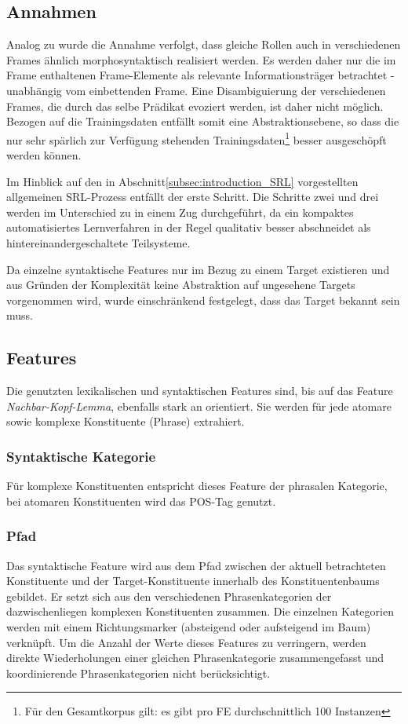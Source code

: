 \documentclass[12pt]{article}
\begin{document}
\subsection{Annahmen}

Analog zu \cite{gildea} wurde die Annahme verfolgt, dass gleiche Rollen auch in verschiedenen Frames ähnlich morphosyntaktisch realisiert werden. Es werden daher nur die im Frame enthaltenen Frame-Elemente als relevante Informationsträger betrachtet - unabhängig vom einbettenden Frame. Eine Disambiguierung der verschiedenen Frames, die durch das selbe Prädikat evoziert werden, ist daher nicht möglich. Bezogen auf die Trainingsdaten entfällt somit eine Abstraktionsebene, so dass die nur sehr spärlich zur Verfügung stehenden Trainingsdaten\footnote{Für den Gesamtkorpus gilt: es gibt pro FE durchschnittlich 100 Instanzen} besser ausgeschöpft werden können.

Im Hinblick auf den in Abschnitt\ref{subsec:introduction_SRL} vorgestellten allgemeinen SRL-Prozess entfällt der erste Schritt. Die Schritte zwei und drei werden im Unterschied zu \cite{gildea} in einem Zug durchgeführt, da ein kompaktes automatisiertes Lernverfahren in der Regel qualitativ besser abschneidet als hintereinandergeschaltete Teilsysteme.

Da einzelne syntaktische Features nur im Bezug zu einem Target existieren und aus Gründen der Komplexität keine Abstraktion auf ungesehene Targets vorgenommen wird, wurde einschränkend festgelegt, dass das Target bekannt sein muss.

\subsection{Features}
Die genutzten lexikalischen und syntaktischen Features sind, bis auf das Feature \textit{Nachbar-Kopf-Lemma}, ebenfalls stark an \cite{gildea} orientiert. Sie werden für jede atomare sowie komplexe Konstituente (Phrase) extrahiert.

\subsubsection*{Syntaktische Kategorie}
Für komplexe Konstituenten entspricht dieses Feature der phrasalen Kategorie, bei atomaren Konstituenten wird das POS-Tag genutzt.
\subsubsection*{Pfad}
Das syntaktische Feature wird aus dem Pfad zwischen der aktuell betrachteten Konstituente und der Target-Konstituente innerhalb des Konstituentenbaums gebildet. Er setzt sich aus den verschiedenen Phrasenkategorien der dazwischenliegen komplexen Konstituenten zusammen. Die einzelnen Kategorien werden mit einem Richtungsmarker (absteigend oder aufsteigend im Baum) verknüpft. Um die Anzahl der Werte dieses Features zu verringern, werden direkte Wiederholungen einer gleichen Phrasenkategorie zusammengefasst und koordinierende Phrasenkategorien nicht berücksichtigt.
\end{document}
